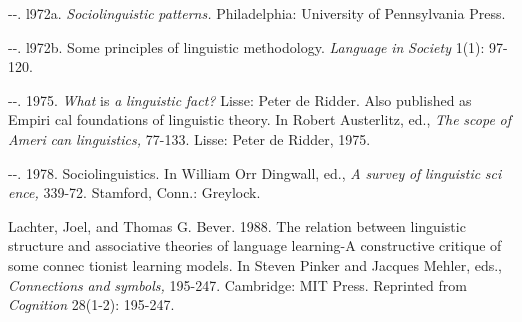 \begin{listWWNumvileveli}
\item 
\begin{styleStandard}
{}-{}-. l972a. \textit{Sociolinguistic}\textit{ }\textit{patterns.}\textit{ }Philadelphia: University of Pennsylvania Press.
\end{styleStandard}


\item 
\begin{styleStandard}
{}-{}-. l972b. Some principles of linguistic methodology. \textit{Language}\textit{ }\textit{in}\textit{ }\textit{Society}\textit{ }1(1): 97-120.
\end{styleStandard}


\end{listWWNumvileveli}
\clearpage\setcounter{page}{1}\begin{listWWNumvileveli}
\item 
\begin{styleStandard}
{}-{}-. 1975. \textit{What}\textit{ }is \textit{a}\textit{ }\textit{linguistic}\textit{ }\textit{fact?}\textit{ }Lisse: Peter de Ridder. Also published as Empiri\- cal foundations of linguistic theory. In Robert Austerlitz, ed., \textit{The}\textit{ }\textit{scope}\textit{ }\textit{of}\textit{ }\textit{Ameri\-}\textit{ }\textit{can}\textit{ }\textit{linguistics,}\textit{ }77-133. Lisse: Peter de Ridder, 1975.
\end{styleStandard}


\item 
\begin{styleStandard}
{}-{}-. 1978. Sociolinguistics. In William Orr Dingwall, ed., \textit{A}\textit{ }\textit{survey}\textit{ }\textit{of}\textit{ }\textit{linguistic}\textit{ }\textit{sci\-}\textit{ }\textit{ence,}\textit{ }339{}-72. Stamford, Conn.: Greylock.
\end{styleStandard}


\end{listWWNumvileveli}
\begin{styleStandard}
Lachter, Joel, and Thomas G. Bever. 1988. The relation between linguistic structure and associative theories of language learning-A constructive critique of some connec\- tionist learning models. In Steven Pinker and Jacques Mehler, eds., \textit{Connections}\textit{ }\textit{and}\textit{ }\textit{symbols,}\textit{ }195-247. Cambridge: MIT Press. Reprinted from \textit{Cognition}\textit{ }28(1-2): 195-247.
\end{styleStandard}


